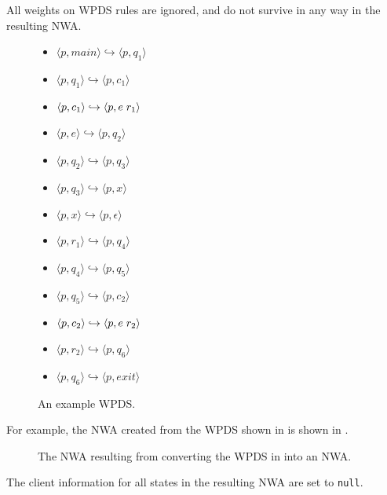 All weights on WPDS rules are ignored, and do not survive in any way in the
resulting NWA.


\begin{figure}[t]
  \centering
    \begin{itemize}
      \centering
      \item{ $\langle p,main \rangle \hookrightarrow \langle p,q_1 \rangle$}
      \item{ $\langle p,q_1 \rangle \hookrightarrow \langle p,c_1 \rangle$}
      \item{ $\langle p,c_1 \rangle \hookrightarrow \langle p,e \hspace{.1cm} r_1 \rangle$}
      \item{ $\langle p,e \rangle \hookrightarrow \langle p,q_2 \rangle$}
      \item{ $\langle p,q_2 \rangle \hookrightarrow \langle p,q_3 \rangle$}
      \item{ $\langle p,q_3 \rangle \hookrightarrow \langle p,x \rangle$}
      \item{ $\langle p,x \rangle \hookrightarrow \langle p,\epsilon \rangle$}
      \item{ $\langle p,r_1 \rangle \hookrightarrow \langle p,q_4 \rangle$}
      \item{ $\langle p,q_4 \rangle \hookrightarrow \langle p,q_5 \rangle$}
      \item{ $\langle p,q_5 \rangle \hookrightarrow \langle p,c_2 \rangle$}
      \item{ $\langle p,c_2 \rangle \hookrightarrow \langle p,e \hspace{.1cm} r_2 \rangle$}
      \item{ $\langle p,r_2 \rangle \hookrightarrow \langle p,q_6 \rangle$}
      \item{ $\langle p,q_6 \rangle \hookrightarrow \langle p,exit \rangle$}
    \end{itemize}
  \caption{An example WPDS.}
  \label{Fi:WpdsToNwa1}
\end{figure}

For example, the NWA created from the WPDS shown in
 is shown in .

\begin{figure}[t]
  \centering
  \caption{The NWA resulting from converting the WPDS in  into an NWA.}
  \label{Fi:WpdsToNwa2}
\end{figure}


The client information for all states in the resulting NWA are set to \texttt{null}.


